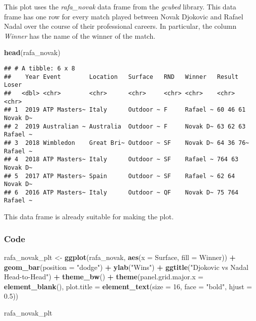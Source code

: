 \documentclass[]{book}
\newenvironment{Shaded}{\begin{snugshade}}{\end{snugshade}}
\newcommand{\DataTypeTok}[1]{\textcolor[rgb]{0.13,0.29,0.53}{#1}}
\newcommand{\DecValTok}[1]{\textcolor[rgb]{0.00,0.00,0.81}{#1}}
\newcommand{\FloatTok}[1]{\textcolor[rgb]{0.00,0.00,0.81}{#1}}
\newcommand{\KeywordTok}[1]{\textcolor[rgb]{0.13,0.29,0.53}{\textbf{#1}}}
\newcommand{\NormalTok}[1]{#1}
\newcommand{\OperatorTok}[1]{\textcolor[rgb]{0.81,0.36,0.00}{\textbf{#1}}}
\newcommand{\StringTok}[1]{\textcolor[rgb]{0.31,0.60,0.02}{#1}}
\begin{document}
This plot uses the \emph{rafa\_novak} data frame from the \emph{gcubed} library. This data frame has one row for every match played between Novak Djokovic and Rafael Nadal over the course of their professional careers. In particular, the column \emph{Winner} has the name of the winner of the match.

\begin{Shaded}
\begin{Highlighting}[]
\KeywordTok{head}\NormalTok{(rafa_novak)}
\end{Highlighting}
\end{Shaded}

\begin{verbatim}
## # A tibble: 6 x 8
##    Year Event        Location   Surface   RND   Winner   Result    Loser   
##   <dbl> <chr>        <chr>      <chr>     <chr> <chr>    <chr>     <chr>   
## 1  2019 ATP Masters~ Italy      Outdoor ~ F     Rafael ~ 60 46 61  Novak D~
## 2  2019 Australian ~ Australia  Outdoor ~ F     Novak D~ 63 62 63  Rafael ~
## 3  2018 Wimbledon    Great Bri~ Outdoor ~ SF    Novak D~ 64 36 76~ Rafael ~
## 4  2018 ATP Masters~ Italy      Outdoor ~ SF    Rafael ~ 764 63    Novak D~
## 5  2017 ATP Masters~ Spain      Outdoor ~ SF    Rafael ~ 62 64     Novak D~
## 6  2016 ATP Masters~ Italy      Outdoor ~ QF    Novak D~ 75 764    Rafael ~
\end{verbatim}

This data frame is already suitable for making the plot.

\hypertarget{djokovicnadalcode}{%
\subsubsection*{Code}\label{djokovicnadalcode}}

\begin{Shaded}
\begin{Highlighting}[]
\NormalTok{rafa_novak_plt <-}\StringTok{ }\KeywordTok{ggplot}\NormalTok{(rafa_novak, }\KeywordTok{aes}\NormalTok{(}\DataTypeTok{x =}\NormalTok{ Surface, }\DataTypeTok{fill =}\NormalTok{ Winner)) }\OperatorTok{+}\StringTok{ }
\StringTok{  }\KeywordTok{geom_bar}\NormalTok{(}\DataTypeTok{position =} \StringTok{"dodge"}\NormalTok{) }\OperatorTok{+}\StringTok{ }
\StringTok{  }\KeywordTok{ylab}\NormalTok{(}\StringTok{"Wins"}\NormalTok{) }\OperatorTok{+}\StringTok{ }
\StringTok{  }\KeywordTok{ggtitle}\NormalTok{(}\StringTok{"Djokovic vs Nadal Head-to-Head"}\NormalTok{) }\OperatorTok{+}\StringTok{ }
\StringTok{  }\KeywordTok{theme_bw}\NormalTok{() }\OperatorTok{+}
\StringTok{  }\KeywordTok{theme}\NormalTok{(}\DataTypeTok{panel.grid.major.x =} \KeywordTok{element_blank}\NormalTok{(),}
        \DataTypeTok{plot.title =} \KeywordTok{element_text}\NormalTok{(}\DataTypeTok{size =} \DecValTok{16}\NormalTok{, }\DataTypeTok{face =} \StringTok{"bold"}\NormalTok{, }\DataTypeTok{hjust =} \FloatTok{0.5}\NormalTok{))}

\NormalTok{rafa_novak_plt}
\end{Highlighting}
\end{Shaded}
\end{document}
